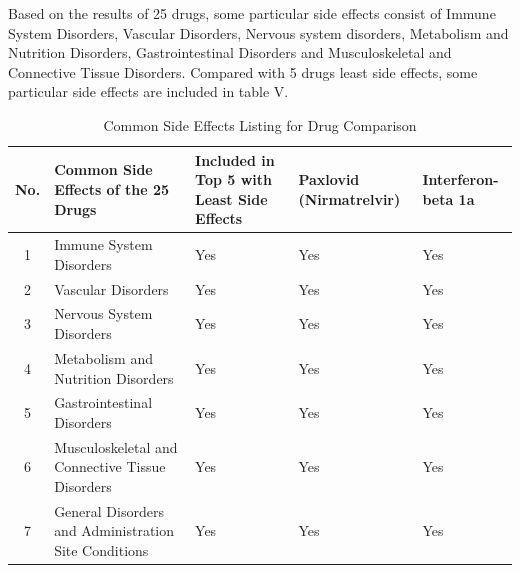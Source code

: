 \documentclass[conference]{IEEEtran}
\begin{document}
Based on the results of 25 drugs, some particular side effects consist of Immune System Disorders, Vascular Disorders, Nervous system disorders, Metabolism and Nutrition Disorders, Gastrointestinal Disorders and Musculoskeletal and Connective Tissue Disorders. Compared with 5 drugs least side effects, some particular side effects are included in table V.\\

\begin{table}[h!]
  \centering
  \caption{Common Side Effects Listing for Drug Comparison}
  \label{tab:large_table}
  \begin{tabular}{
    |c|>{\raggedright\arraybackslash}p{2.2cm}|
    >{\centering\arraybackslash}p{1.5cm}|
    >{\centering\arraybackslash}p{1.2cm}|
    >{\centering\arraybackslash}p{1.2cm}|}
    \hline
    \rowcolor{headercolor}
    \textbf{No.} & \textbf{Common Side Effects of the 25 Drugs}         & \textbf{Included in Top 5 with Least Side Effects} & \textbf{Paxlovid (Nirmatrelvir)} & \textbf{Interferon-beta 1a} \\ \hline
    1            & Immune System Disorders                              & Yes                                                & Yes                              & Yes                         \\ \hline
    2            & Vascular Disorders                                   & Yes                                                & Yes                              & Yes                         \\ \hline
    3            & Nervous System Disorders                             & Yes                                                & Yes                              & Yes                         \\ \hline
    4            & Metabolism and Nutrition Disorders                   & Yes                                                & Yes                              & Yes                         \\ \hline
    5            & Gastrointestinal Disorders                           & Yes                                                & Yes                              & Yes                         \\ \hline
    6            & Musculoskeletal and Connective Tissue Disorders      & Yes                                                & Yes                              & Yes                         \\ \hline
    7            & General Disorders and Administration Site Conditions & Yes                                                & Yes                              & Yes                         \\ \hline

\end{tabular}
\end{table}
\end{document}
